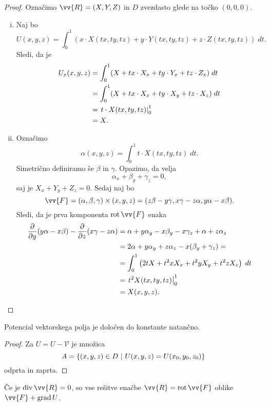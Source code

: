 \begin{proof}
Označimo $\vv{R} = (X, Y, Z)$ in $D$ zvezdasto glede na točko
$(0, 0, 0)$.

\begin{enumerate}[i)]
\item Naj bo
\[
U(x,y,z) = \int_0^1 \left(
x \cdot X(tx, ty, tz) +
y \cdot Y(tx, ty, tz) +
z \cdot Z(tx, ty, tz)
\right)\;dt.
\]
Sledi, da je
\begin{align*}
U_x(x,y,z)
&=
\int_0^1 (X + tx \cdot X_x + ty \cdot Y_x + tz \cdot Z_x )\;dt
\\
&=
\int_0^1 (X + tx \cdot X_x + ty \cdot X_y + tz \cdot X_z)\;dt
\\
&=
\left. t \cdot X(tx, ty, tz)\right|_{0}^{1}
\\
&= X.
\end{align*}
\item Označimo
\[
\alpha(x,y,z) = \int_0^1 t \cdot X(tx, ty, tz)\;dt.
\]
Simetrično definiramo še $\beta$ in $\gamma$. Opazimo, da velja
\[
\alpha_x + \beta_y + \gamma_z = 0,
\]
saj je $X_x + Y_y + Z_z = 0$. Sedaj naj bo
\[
\vv{F} =
(\alpha, \beta, \gamma) \times (x, y, z) =
(z \beta - y \gamma, x \gamma - z \alpha, y \alpha - x \beta).
\]
Sledi, da je prva komponenta $\rot \vv{F}$ enaka
\begin{align*}
\frac{\partial}{\partial y} (y \alpha - x \beta) -
\frac{\partial}{\partial z} (x \gamma - z \alpha)
&=
\alpha + y \alpha_y - x \beta_y - x \gamma_z + \alpha + z \alpha_z
\\
&=
2 \alpha + y \alpha_y + z \alpha_z - x(\beta_y + \gamma_z) =
\\
&=
\int_0^1 \left(2t X + t^2x X_x + t^2y X_y + t^2z X_z\right)\;dt
\\
&=
\left. t^2 X(tx, ty, tz)\right|_{0}^{1}
\\
&= X(x, y, z). \qedhere
\end{align*}
\end{enumerate}
\end{proof}

\begin{opomba}
Potencial vektorskega polja je določen do konstante natančno.
\end{opomba}

\begin{proof}
Za $U = U - \mathcal{V}$ je množica
\[
A = \left\{(x,y,z) \in D~\middle\vert~U(x,y,z) = U(x_0,y_0,z_0)\right\}
\]
odprta in zaprta.
\end{proof}

\begin{opomba}
Če je $\dv \vv{R} = 0$, so vse rešitve enačbe
$\vv{R} = \rot \vv{F}$ oblike $\vv{F} + \grad U$.
\end{opomba}

